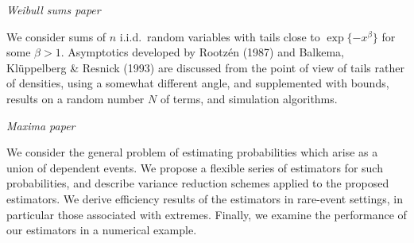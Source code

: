 \emph{Weibull sums paper}

We consider sums of $n$ i.i.d.\ random variables with tails close to $\exp\{-x^\beta\}$ for some $\beta>1$. Asymptotics  developed
by Rootz\'en (1987) and Balkema, Kl\"uppelberg \& Resnick (1993) are discussed from the point of view of tails rather of densities, using a somewhat different angle,  and supplemented with bounds, results on a random number $N$ of terms, and simulation algorithms.

\emph{Maxima paper} 

We consider the general problem of estimating probabilities which arise as
a union of dependent events. We propose a flexible series of
estimators for such probabilities, and describe variance reduction schemes applied
to the proposed estimators. We derive efficiency results of the estimators in  rare-event settings, in particular those associated with extremes. Finally, we examine the performance of our estimators in a numerical example.











